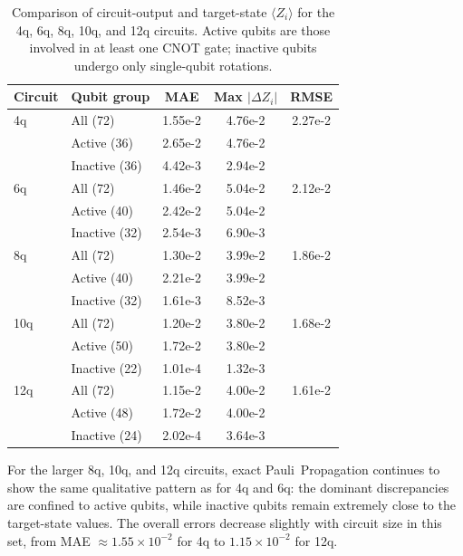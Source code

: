\documentclass[11pt]{article}
\begin{document}
\begin{table}[h]
\centering
\caption{Comparison of circuit-output and target-state $\langle Z_i \rangle$ for the 4q, 6q, 8q, 10q, and 12q circuits.
Active qubits are those involved in at least one CNOT gate; inactive qubits undergo only single-qubit rotations.}
\label{tab:main}
\begin{tabular}{llS[table-format=1.2e-1]S[table-format=1.2e-1]S[table-format=1.2e-1]}
\toprule
Circuit & Qubit group & {MAE} & {Max $|\Delta Z_i|$} & {RMSE} \\
\midrule
4q & All (72)       & 1.55e-2 & 4.76e-2 & 2.27e-2 \\
   & Active (36)    & 2.65e-2 & 4.76e-2 &         \\
   & Inactive (36)  & 4.42e-3 & 2.94e-2 &         \\
\midrule
6q & All (72)       & 1.46e-2 & 5.04e-2 & 2.12e-2 \\
   & Active (40)    & 2.42e-2 & 5.04e-2 &         \\
   & Inactive (32)  & 2.54e-3 & 6.90e-3 &         \\
\midrule
8q & All (72)       & 1.30e-2 & 3.99e-2 & 1.86e-2 \\
   & Active (40)    & 2.21e-2 & 3.99e-2 &         \\
   & Inactive (32)  & 1.61e-3 & 8.52e-3 &         \\
\midrule
10q & All (72)      & 1.20e-2 & 3.80e-2 & 1.68e-2 \\
    & Active (50)   & 1.72e-2 & 3.80e-2 &         \\
    & Inactive (22) & 1.01e-4 & 1.32e-3 &         \\
\midrule
12q & All (72)      & 1.15e-2 & 4.00e-2 & 1.61e-2 \\
    & Active (48)   & 1.72e-2 & 4.00e-2 &         \\
    & Inactive (24) & 2.02e-4 & 3.64e-3 &         \\
\bottomrule
\end{tabular}
\end{table}

For the larger 8q, 10q, and 12q circuits, exact Pauli~Propagation continues to show the same qualitative pattern as for 4q and 6q: the dominant discrepancies are confined to active qubits, while inactive qubits remain extremely close to the target-state values.
The overall errors decrease slightly with circuit size in this set, from MAE $\approx 1.55\times 10^{-2}$ for 4q to $1.15\times 10^{-2}$ for 12q.
\end{document}
